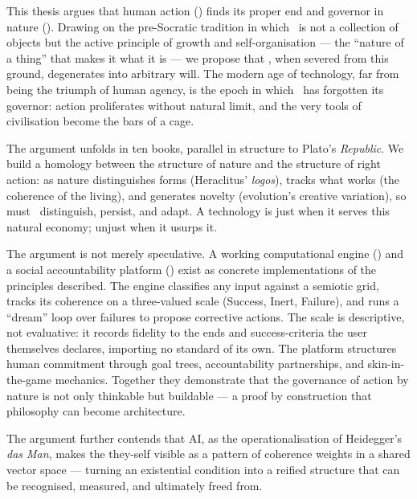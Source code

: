 This thesis argues that human action (\praxis) finds its proper end and governor
in nature (\physis). Drawing on the pre-Socratic tradition in which \physis\ is
not a collection of objects but the active principle of growth and
self-organisation --- the ``nature of a thing'' that makes it what it is --- we
propose that \praxis, when severed from this ground, degenerates into arbitrary
will. The modern age of technology, far from being the triumph of human agency,
is the epoch in which \praxis\ has forgotten its governor: action proliferates
without natural limit, and the very tools of civilisation become the bars of a
cage.

The argument unfolds in ten books, parallel in structure to Plato's
\emph{Republic}. We build a homology between the structure of nature and the
structure of right action: as nature distinguishes forms (Heraclitus' \emph{logos}),
tracks what works (the coherence of the living), and generates novelty (evolution's
creative variation), so must \praxis\ distinguish, persist, and adapt. A technology
is just when it serves this natural economy; unjust when it usurps it.

The argument is not merely speculative. A working computational engine (\physis)
and a social accountability platform (\praxis) exist as concrete implementations
of the principles described. The engine classifies any input against a semiotic
grid, tracks its coherence on a three-valued scale (Success, Inert, Failure),
and runs a ``dream'' loop over failures to propose corrective actions. The scale is
descriptive, not evaluative: it records fidelity to the ends and success-criteria the
user themselves declares, importing no standard of its own. The platform
structures human commitment through goal trees, accountability partnerships, and
skin-in-the-game mechanics. Together they demonstrate that the governance of
action by nature is not only thinkable but buildable --- a proof by construction
that philosophy can become architecture.

The argument further contends that AI, as the operationalisation of Heidegger's
\emph{das Man}, makes the they-self visible as a pattern of coherence weights
in a shared vector space --- turning an existential condition into a reified
structure that can be recognised, measured, and ultimately freed from.

